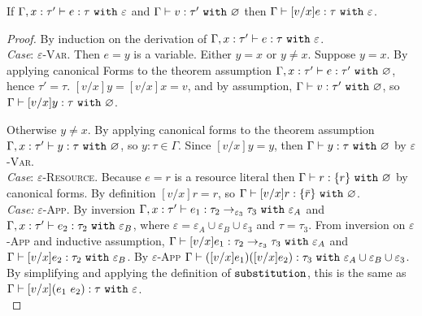 \documentclass[acmsmall,review,anonymous]{acmart}\settopmatter{printfolios=true}
\begin{document}
\hrulefill


\begin{lemma}
If $\Gamma, x: \tau' \vdash e: \tau~\mathtt{with}~ \varepsilon$ and $\Gamma \vdash v: \tau'~\mathtt{with}~ \varnothing$ then $\Gamma \vdash [v/x]e: \tau~\mathtt{with}~ \varepsilon$.
\end{lemma}


\begin{proof} By induction on the derivation of $ \Gamma, x:  \tau' \vdash e:  \tau~\mathtt{with}~ \varepsilon$. \\

\textit{Case}: \textsc{$\varepsilon$-Var}. Then $ e = y$ is a variable. Either $y = x$ or $y \neq x$. Suppose $y=x$. By applying canonical Forms to the theorem assumption $\Gamma, x: \tau' \vdash e: \tau'~\mathtt{with}~ \varnothing$, hence $\tau' = \tau$. $[v/x]y = [v/x]x = v$, and by assumption, $\Gamma \vdash v: \tau'~\mathtt{with}~ \varnothing$, so $\Gamma \vdash [v/x]y: \tau~\mathtt{with}~ \varnothing$.

Otherwise $y \neq x$. By applying canonical forms to the theorem assumption $\Gamma, x: \tau' \vdash y: \tau~\mathtt{with}~ \varnothing$, so $y: \tau \in \Gamma$. Since $[v/x]y = y$, then $\Gamma \vdash y: \tau~\mathtt{with}~ \varnothing$ by \textsc{$\varepsilon$-Var}. \\

\textit{Case}: \textsc{$\varepsilon$-Resource}. Because $ e = r$ is a resource literal then $ \Gamma \vdash r:  \{ r \}~\mathtt{with}~ \varnothing$ by canonical forms. By definition $[ v/x]r = r$, so $ \Gamma \vdash [ v/x]r:  \{ \bar r\}~\mathtt{with}~ \varnothing$. \\

\textit{Case:} \textsc{$\varepsilon$-App}. By inversion $ \Gamma, x:  \tau' \vdash  e_1: \tau_2 \rightarrow_{\varepsilon_3}  \tau_3~\mathtt{with}~ \varepsilon_A$ and $ \Gamma, x:  \tau' \vdash  e_2:  \tau_2~\mathtt{with}~ \varepsilon_B$, where $\varepsilon = \varepsilon_A \cup \varepsilon_B \cup \varepsilon_3$ and $ \tau =  \tau_3$. From inversion on \textsc{$\varepsilon$-App} and inductive assumption, $ \Gamma \vdash [ v/x] e_1:  \tau_2 \rightarrow_{\varepsilon_3}  \tau_3~\mathtt{with}~ \varepsilon_A$ and $ \Gamma \vdash [ v/x] e_2:  \tau_2~\mathtt{with}~ \varepsilon_B$. By \textsc{$\varepsilon$-App}  $ \Gamma \vdash ([ v/x] e_1) ([ v/x] e_2) :  \tau_3~\mathtt{with}~ \varepsilon_A \cup \varepsilon_B \cup \varepsilon_3$. By simplifying and applying the definition of $\mathtt{substitution}$, this is the same as $ \Gamma \vdash [ v/x]( e_1~ e_2):  \tau~\mathtt{with}~ \varepsilon$. \\


\end{proof}
\end{document}
